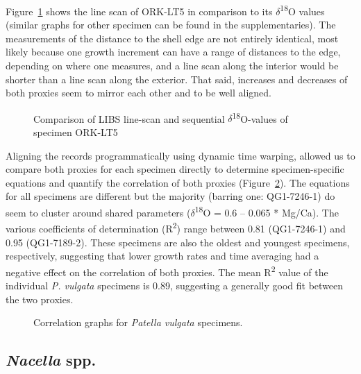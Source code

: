 \documentclass[
  authoryear,
  preprint,
  3p]{elsarticle}
\begin{document}
Figure~\ref{fig-Pat_Comp} shows the line scan of ORK-LT5 in comparison
to its \(\delta\)\textsuperscript{18}O values (similar graphs for other
specimen can be found in the supplementaries). The measurements of the
distance to the shell edge are not entirely identical, most likely
because one growth increment can have a range of distances to the edge,
depending on where one measures, and a line scan along the interior
would be shorter than a line scan along the exterior. That said,
increases and decreases of both proxies seem to mirror each other and to
be well aligned.

\begin{figure}


\caption{\label{fig-Pat_Comp}Comparison of LIBS line-scan and sequential
\(\delta\)\textsuperscript{18}O-values of specimen ORK-LT5}

\end{figure}%

Aligning the records programmatically using dynamic time warping,
allowed us to compare both proxies for each specimen directly to
determine specimen-specific equations and quantify the correlation of
both proxies (Figure~\ref{fig-Pat_Corr}). The equations for all
specimens are different but the majority (barring one: QG1-7246-1) do
seem to cluster around shared parameters
(\(\delta\)\textsuperscript{18}Ο = 0.6 -- 0.065 * Mg/Ca). The various
coefficients of determination (R\textsuperscript{2}) range between 0.81
(QG1-7246-1) and 0.95 (QG1-7189-2). These specimens are also the oldest
and youngest specimens, respectively, suggesting that lower growth rates
and time averaging had a negative effect on the correlation of both
proxies. The mean R\textsuperscript{2} value of the individual \emph{P.
vulgata} specimens is 0.89, suggesting a generally good fit between the
two proxies.

\begin{figure}


\caption{\label{fig-Pat_Corr}Correlation graphs for \emph{Patella
vulgata} specimens.}

\end{figure}%

\subsection{\texorpdfstring{\emph{Nacella}
spp.}{Nacella spp.}}\label{nacella-spp.}
\end{document}
